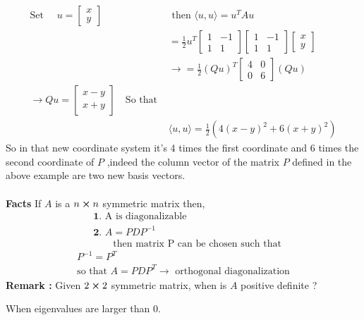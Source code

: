 \documentclass[
12pt,
]{article}
\newcommand{\la}{\langle}
\newcommand{\ra}{\rangle}
\theoremstyle{definition}
\theoremstyle{definition}
\theoremstyle{definition}
\theoremstyle{definition}
\begin{document}
\begin{align*}
	\text{Set } \quad u = 
	\begin{bmatrix}
		x \\
		y
	\end{bmatrix}
	\qquad &\text{ then  }  \la  u,u\ra = u^{T}Au \\
	& = \frac{1}{2}u^{T} 
	\begin{bmatrix}
			1 & -1\\
			1 & 1
			\end{bmatrix}
	\begin{bmatrix}
	1 & -1 \\
	1 & 1
	\end{bmatrix}
	\begin{bmatrix}
	x \\ 
	y
	\end{bmatrix}\\
	&\xrightarrow{} = \frac{1}{2}(Qu)^{T}
	\begin{bmatrix}
	4 & 0 \\
	0 & 6
	\end{bmatrix} (Qu) \\
	\xrightarrow{} Qu = 
	\begin{bmatrix}
		x-y \\
		x+y
	\end{bmatrix} \quad \text{So that }\\
	&  \la  u,u\ra = \frac{1}{2}(4(x-y)^2 + 6(x+y)^2)
\end{align*}
So in that new coordinate system it's 4 times the first coordinate and 6 times the second coordinate of $P$ ,indeed the column vector of the matrix $P$ defined in the above example are two new basis vectors. \\ \\ 
\textbf{Facts } If $A$ is a $n\cross n$ symmetric matrix then,
\begin{align*}
&\textbf{1. } \text{A is diagonalizable} \\
&\textbf{2. }A = PDP^{-1}\\
&\qquad \text{then matrix P can be chosen such that}
\end{align*}
\begin{gather*}
P^{-1} = P^{T} \\
\text{so that } A = PDP^{T} \xrightarrow{} \text{ orthogonal diagonalization}
\end{gather*} 
\textbf{Remark :} Given $2\cross 2$ symmetric matrix, when is $A$ positive definite ? 
\begin{center}
	When eigenvalues are larger than 0.
\end{center}
\end{document}
